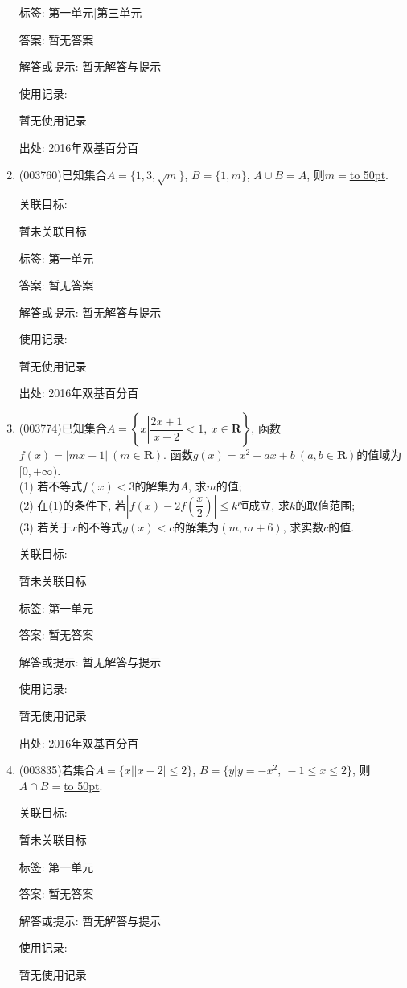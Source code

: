 \documentclass[10pt,a4paper]{article}
\newcommand{\blank}[1]{\underline{\hbox to #1pt{}}}
\begin{document}
\begin{enumerate}[1.]
标签: 第一单元|第三单元

答案: 暂无答案

解答或提示: 暂无解答与提示

使用记录:

暂无使用记录


出处: 2016年双基百分百
\item { (003760)}已知集合$A=\{1,3,\sqrt{m}\}$, $B=\{1,m\}$, $A\cup B=A$, 则$m=$\blank{50}.


关联目标:

暂未关联目标



标签: 第一单元

答案: 暂无答案

解答或提示: 暂无解答与提示

使用记录:

暂无使用记录


出处: 2016年双基百分百
\item { (003774)}已知集合$A=\left\{x\left|\dfrac{2x+1}{x+2}<1, \ x\in \mathbf{R}\right.\right\}$, 函数$f(x)=|mx+1| \ (m\in \mathbf{R})$. 函数$g(x)=x^2+ax+b \ (a,b\in \mathbf{R})$的值域为$[0,+\infty)$.\\
(1) 若不等式$f(x)<3$的解集为$A$, 求$m$的值;\\
(2) 在(1)的条件下, 若$\left|f(x)-2f\left(\dfrac x 2\right)\right|\le k$恒成立, 求$k$的取值范围;\\
(3) 若关于$x$的不等式$g(x)<c$的解集为$(m,m+6)$, 求实数$c$的值.


关联目标:

暂未关联目标



标签: 第一单元

答案: 暂无答案

解答或提示: 暂无解答与提示

使用记录:

暂无使用记录


出处: 2016年双基百分百
\item { (003835)}若集合$A=\{x||x-2|\le 2\}$, $B=\{y|y=-x^2, \ -1\le x\le 2\}$, 则$A\cap B=$\blank{50}.


关联目标:

暂未关联目标



标签: 第一单元

答案: 暂无答案

解答或提示: 暂无解答与提示

使用记录:

暂无使用记录



\end{enumerate}
\end{document}
